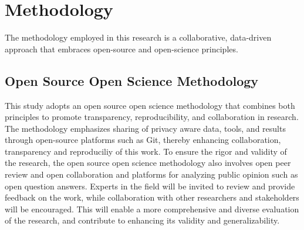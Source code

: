 \documentclass{IEEEtran}
\begin{document}





\section{Methodology}

The methodology employed in this research is a collaborative, data-driven approach that embraces open-source and open-science principles.

\subsection{Open Source Open Science Methodology}

This study adopts an open source open science methodology that combines both principles to promote transparency, reproducibility, and collaboration in research. The methodology emphasizes sharing of privacy aware data, tools, and results through open-source platforms such as Git, thereby enhancing collaboration, transparency and reproduciliy of this work.
To ensure the rigor and validity of the research, the open source open science methodology also involves open peer review and open collaboration and platforms for analyzing public opinion such as open question answers. Experts in the field will be invited to review and provide feedback on the work, while collaboration with other researchers and stakeholders will be encouraged. This will enable a more comprehensive and diverse evaluation of the research, and contribute to enhancing its validity and generalizability.
\end{document}
